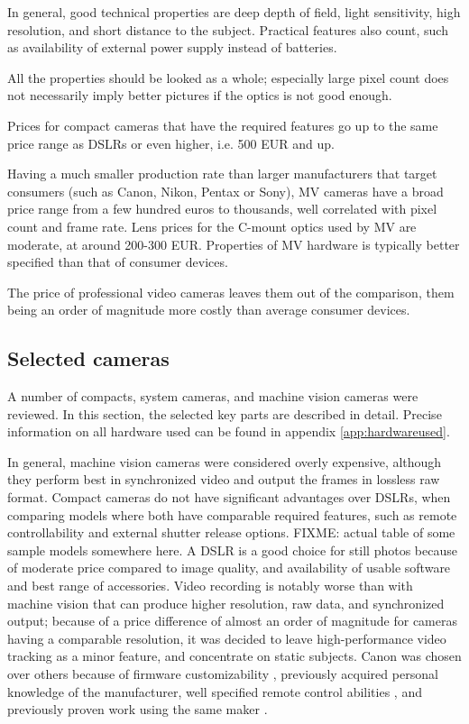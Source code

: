 In general, good technical properties are deep depth of field, light sensitivity, high resolution, and short distance to the subject.
Practical features also count, such as availability of external power supply instead of batteries.

All the properties should be looked as a whole; especially large pixel count does not necessarily imply better pictures if the optics is not good enough.

Prices for compact cameras that have the required features go up to the same price range as DSLRs or even higher, i.e. 500 EUR and up.

Having a much smaller production rate than larger manufacturers that target consumers (such as Canon, Nikon, Pentax or Sony), MV cameras have a broad price range from a few hundred euros to thousands, well correlated with pixel count and frame rate.
Lens prices for the C-mount optics used by MV are moderate, at around 200-300 EUR.
Properties of MV hardware is typically better specified than that of consumer devices.

The price of professional video cameras leaves them out of the comparison, them being an order of magnitude more costly than average consumer devices.


\subsection{Selected cameras} %

A number of compacts, system cameras, and machine vision cameras were reviewed.
In this section, the selected key parts are described in detail.
Precise information on all hardware used can be found in appendix \ref{app:hardwareused}.

In general, machine vision cameras were considered overly expensive, although they perform best in synchronized video and output the frames in lossless raw format.
Compact cameras do not have significant advantages over DSLRs, when comparing models where both have comparable required features, such as remote controllability and external shutter release options.
{ \color{red} FIXME: actual table of some sample models somewhere here. }
A DSLR is a good choice for still photos because of moderate price compared to image quality, and availability of usable software and best range of accessories.
Video recording is notably worse than with machine vision that can produce higher resolution, raw data, and synchronized output;
because of a price difference of almost an order of magnitude for cameras having a comparable resolution, it was decided to leave high-performance video tracking as a minor feature, and concentrate on static subjects.
Canon was chosen over others because of firmware customizability \cite{magiclantern}, previously acquired personal knowledge of the manufacturer, well specified remote control abilities \cite{canonedsdk}, and previously proven work using the same maker \cite{ir-ltd,ten24,capturelab,agisoftforum}.


